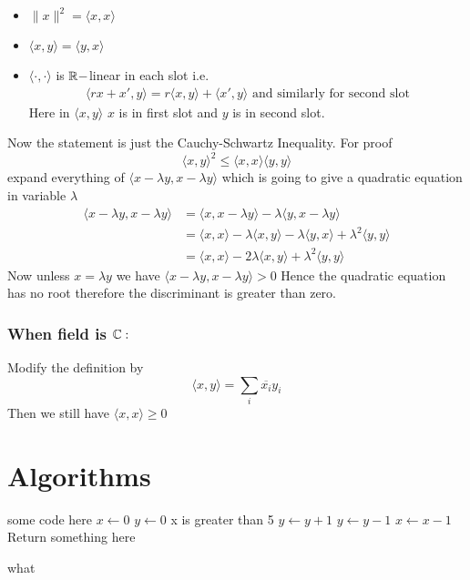 \documentclass[12pt]{report}
\begin{document}
{	\begin{note}
		\begin{itemize}
			\item $\|x\|^2=\langle x,x\rangle$
			\item $\langle x,y\rangle=\langle y,x\rangle$
			\item $\langle \cdot,\cdot\rangle$ is $\mathbb{R}-$linear in each slot i.e. \begin{align*}
				      \langle rx+x',y\rangle=r\langle x,y\rangle+\langle x',y\rangle	\text{ and similarly for second slot}
			      \end{align*}Here in $\langle x,y\rangle$ $x$ is in first slot and $y$ is in second slot.
		\end{itemize}
	\end{note}Now the statement is just the Cauchy-Schwartz Inequality. For proof $$\langle x,y\rangle^2\leq \langle x,x\rangle\langle y,y\rangle $$ expand everything of $\langle x-\lambda y,x-\lambda y\rangle$ which is going to give a quadratic equation in variable $\lambda $ \begin{align*}
		\langle x-\lambda y,x-\lambda y\rangle & =\langle x,x-\lambda y\rangle-\lambda\langle y,x-\lambda y\rangle                                       \\
		                                       & =\langle x ,x\rangle -\lambda\langle x,y\rangle -\lambda\langle y,x\rangle +\lambda^2\langle y,y\rangle \\
		                                       & =\langle x,x\rangle -2\lambda\langle x,y\rangle+\lambda^2\langle y,y\rangle
	\end{align*}Now unless $x=\lambda y$ we have $\langle x-\lambda y,x-\lambda y\rangle>0$ Hence the quadratic equation has no root therefore the discriminant is greater than zero.

	\subsubsection*{\textbf{When field is $\mathbb{C}:$}}Modify the definition by $$\langle x,y\rangle=\sum_i\overline{x_i}y_i$$Then we still have $\langle x,x\rangle\geq 0$}

\section{Algorithms}
\begin{algorithm}[H]
\SetAlgoLined
\SetNoFillComment
{}
\vspace{3mm}
some code here\;
$x \leftarrow 0$\;
$y \leftarrow 0$\;
 {
    x is greater than 5 
}
 {
    $y \leftarrow y + 1$\;
}
 {
    $y \leftarrow y - 1$\;
}
 {
    $x \leftarrow x - 1$\;
}
\Return Return something here\;
\caption{what}
\end{algorithm}
\end{document}
